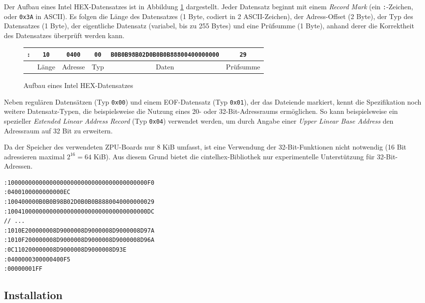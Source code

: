\documentclass[11pt]{scrartcl}
\begin{document}
Der Aufbau eines Intel HEX-Datensatzes ist in Abbildung \ref{record_structure} dargestellt. Jeder Datensatz beginnt mit einem \emph{Record Mark} (ein \texttt{:}-Zeichen, oder \texttt{0x3A} in ASCII). Es folgen die Länge des Datensatzes (1 Byte, codiert in 2 ASCII-Zeichen), der Adress-Offset (2 Byte), der Typ des Datensatzes (1 Byte), der eigentliche Datensatz (variabel, bis zu 255 Bytes) und eine Prüfsumme (1 Byte), anhand derer die Korrektheit des Datensatzes überprüft werden kann.

\begin{figure}[h!]
\begin{center}
\begin{tabular}{cccccc}
	\toprule
	\texttt{:} & \texttt{10} & \texttt{0400} & \texttt{00} & \texttt{B0B0B98B02D0B0B0B88800400000000} & \texttt{29} \\ \midrule
	& Länge & Adresse & Typ & Daten & Prüfsumme \\ \bottomrule
\end{tabular}
\caption{Aufbau eines Intel HEX-Datensatzes}
\label{record_structure}
\end{center}
\end{figure}

Neben regulären Datensätzen (Typ \texttt{0x00}) und einem EOF-Datensatz (Typ \texttt{0x01}), der das Dateiende markiert, kennt die Spezifikation noch weitere Datensatz-Typen, die beispielsweise die Nutzung eines 20- oder 32-Bit-Adressraums ermöglichen. So kann beispielsweise ein spezieller \emph{Extended Linear Address Record} (Typ \texttt{0x04}) verwendet werden, um durch Angabe einer \emph{Upper Linear Base Address} den Adressraum auf 32 Bit zu erweitern.

Da der Speicher des verwendeten ZPU-Boards nur 8 KiB umfasst, ist eine Verwendung der 32-Bit-Funktionen nicht notwendig (16 Bit adressieren maximal $2^{16} = 64$ KiB). Aus diesem Grund bietet die cintelhex-Bibliothek nur experimentelle Unterstützung für 32-Bit-Adressen.

\begin{lstlisting}[caption=Beispiel einer Intel HEX-Eingabedatei]
:1000000000000000000000000000000000000000F0
:0400100000000000EC
:100400000B0B0B98B02D0B0B0B8880040000000029
:1004100000000000000000000000000000000000DC
// ...
:1010E200000008D9000008D9000008D9000008D97A
:1010F200000008D9000008D9000008D9000008D96A
:0C110200000008D9000008D9000008D93E
:0400000300000400F5
:00000001FF
\end{lstlisting}

\subsection{Installation}
\end{document}
